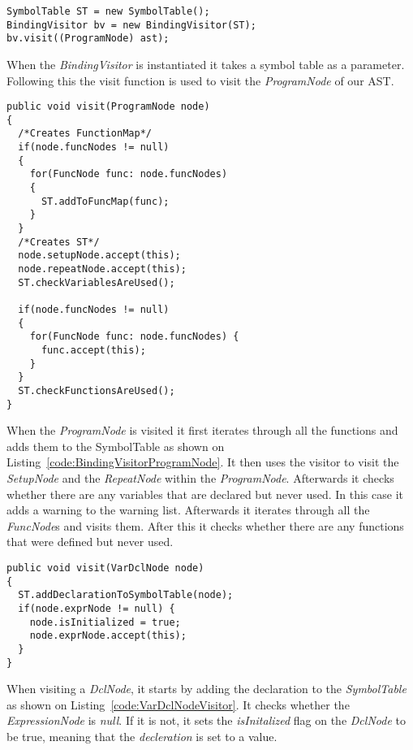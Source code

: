 \begin{lstlisting}[caption={Code for binding visitor call}, label={code:BindingVisitorCall}]
SymbolTable ST = new SymbolTable();
BindingVisitor bv = new BindingVisitor(ST);
bv.visit((ProgramNode) ast);
\end{lstlisting}
When the \textit{BindingVisitor} is instantiated it takes a symbol table as a parameter. Following this the visit function is used to visit the \textit{ProgramNode} of our AST.

\begin{lstlisting}[caption={Code for the ProgramNode visitor}, label={code:BindingVisitorProgramNode}]
public void visit(ProgramNode node)
{
  /*Creates FunctionMap*/
  if(node.funcNodes != null)
  {
    for(FuncNode func: node.funcNodes)
    {
      ST.addToFuncMap(func);
    } 
  }
  /*Creates ST*/
  node.setupNode.accept(this);
  node.repeatNode.accept(this);
  ST.checkVariablesAreUsed();
		
  if(node.funcNodes != null)
  {
    for(FuncNode func: node.funcNodes) {
      func.accept(this);
    }
  }
  ST.checkFunctionsAreUsed();
}
\end{lstlisting}
When the \textit{ProgramNode} is visited it first iterates through all the functions and adds them to the SymbolTable as shown on Listing~\ref{code:BindingVisitorProgramNode}. It then uses the visitor to visit the \textit{SetupNode} and the \textit{RepeatNode} within the \textit{ProgramNode}.
Afterwards it checks whether there are any variables that are declared but never used. In this case it adds a warning to the warning list.
Afterwards it iterates through all the \textit{FuncNode}s and visits them. After this it checks whether there are any functions that were defined but never used. 
\begin{lstlisting}[caption={Code for the VarDcl visitor}, label={code:VarDclNodeVisitor}]
public void visit(VarDclNode node)
{
  ST.addDeclarationToSymbolTable(node);
  if(node.exprNode != null) {
    node.isInitialized = true;
    node.exprNode.accept(this);
  }
}
\end{lstlisting}
When visiting a \textit{DclNode}, it starts by adding the declaration to the \textit{SymbolTable} as shown on Listing~\ref{code:VarDclNodeVisitor}. It checks whether the \textit{ExpressionNode} is \textit{null}. If it is not, it sets the \textit{isInitalized} flag on the \textit{DclNode} to be true, meaning that the \textit{decleration} is set to a value.

